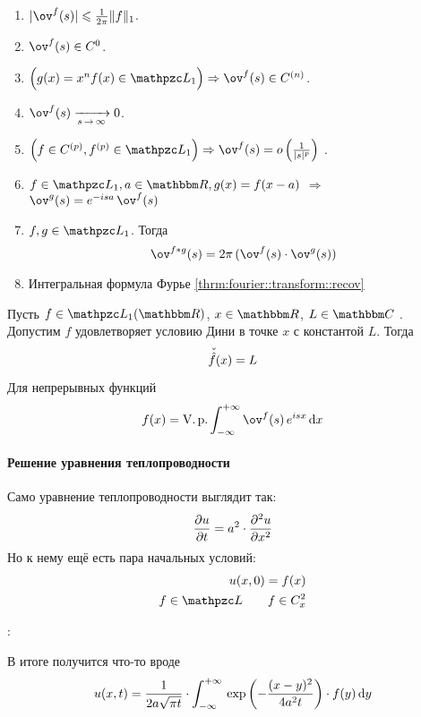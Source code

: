 \documentclass[12pt,draft,timbord]{longnotes}
\begin{document}
\begin{enumerate}
  \item $|\ov^{f} (s) | \leqslant \frac{1}{2\pi} \|f\|_1$.
  \item $\ov^{f}(s) \in C^0 $.
  \item $\Bigl(g(x) = x^n f(x) \in \summb_1 \Bigr)\Rightarrow \ov^{f}(s) \in C^{(n)} $.
  \item $\ov^f(s) \xto{s \to \infty} 0 $.
  \item $\Bigl( f\in C^{(p)},f^{(p)}\in \summb_1\Bigr)
    \Rightarrow\ov^f(s) = o\left(\frac{1}{|s|^p}\right)$ .
  \item $f\in \summb_1, a\in \R, g(x) = f(x-a)$ $ \Rightarrow $ $\ov^g(s) = e^{-isa}\,\ov^f(s)$
  \item $f, g\in \summb_1$. Тогда \[
      \ov^{f\ast g} (s) = 2 \pi \,(\ov^f(s) \cdot \ov^g(s))
    \]
  \item Интегральная формула Фурье \ref{thrm:fourier::transform::recov}
\end{enumerate}

\begin{thrm}\label{thrm:fourier::transform::recov}
  Пусть $f\in \summb_1(\R)$, $x\in \R$, $L\in \C$ .
  Допустим $f$ удовлетворяет условию Дини в точке $x$ с константой $L$. Тогда
  \[
    \check{\vphantom{\sum}\hat{f}} (x) = L
  \]
  Для непрерывных функций \[
    f(x) = \Vp \intR \ov^f(s) \, e^{isx} \, \del x
  \]
\end{thrm}

\paragraph{Решение уравнения теплопроводности}
\label{par:fourier::heat}

Само уравнение теплопроводности выглядит так:
\[
  \frac{\partial u}{\partial t} = a^2 \cdot \frac{\partial^2 u}{\partial x^2} 
\]
Но к нему ещё есть пара начальных условий:
\begin{align*}
  u(x,0) = f(x) \\
  f \in \summb \qquad f \in C^2_x
\end{align*}

\underdev: 

В итоге получится что-то вроде\[
  u(x,t) = \frac{1}{2a\sqrt{\pi t}}  \cdot \int_{-\infty}^{+\infty} \, \exp \left(-\frac{(x-y)^2}{4a^2 t}\right)\cdot f(y) \, \mathrm{d} y 
\]
\end{document}
